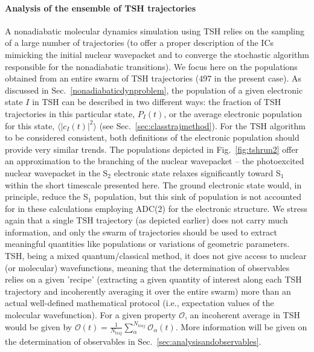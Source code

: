 \documentclass[9pt,bestpractices]{livecoms}
\begin{document}
\paragraph{Analysis of the ensemble of TSH trajectories}

A nonadiabatic molecular dynamics simulation using TSH relies on the sampling of a large number of trajectories (to offer a proper description of the ICs mimicking the initial nuclear wavepacket and to converge the stochastic algorithm responsible for the nonadiabatic transitions). We focus here on the populations obtained from an entire swarm of TSH trajectories (497 in the present case). As discussed in Sec.~\ref{nonadiabaticdynproblem}, the population of a given electronic state $I$ in TSH can be described in two different ways: the fraction of TSH trajectories in this particular state, $P_I(t)$, or the average electronic population for this state, $\langle|c_I(t)|^2\rangle$ (see Sec.~\ref{sec:classtrajmethod}). For the TSH algorithm to be considered consistent, both definitions of the electronic population should provide very similar trends.\cite{Granucci2007} The populations depicted in Fig.~\ref{fig:tshrun2} offer an approximation to the branching of the nuclear wavepacket -- the photoexcited nuclear wavepacket in the S$_2$ electronic state relaxes significantly toward S$_1$ within the short timescale presented here. The ground electronic state would, in principle, reduce the S$_1$ population, but this sink of population is not accounted for in these calculations employing ADC(2) for the electronic structure. We stress again that a single TSH trajectory (as depicted earlier) does not carry much information, and only the swarm of trajectories should be used to extract meaningful quantities like populations or variations of geometric parameters. TSH, being a mixed quantum/classical method, it does not give access to nuclear (or molecular) wavefunctions, meaning that the determination of observables relies on a given 'recipe' (extracting a given quantity of interest along each TSH trajectory and incoherently averaging it over the entire swarm) more than an actual well-defined mathematical protocol (i.e., expectation values of the molecular wavefunction). For a given property $\mathcal{O}$, an incoherent average in TSH would be given by $\mathcal{O}(t) = \frac{1}{N_{\text{traj}}}\sum_\alpha^{N_{\textit{traj}}}\mathcal{O}_\alpha(t)$. More information will be given on the determination of observables in Sec.~\ref{sec:analysisandobservables}.
\end{document}
